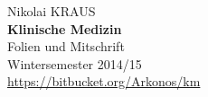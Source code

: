 \begin{titlepage}
\sffamily

\begin{center}
	Nikolai KRAUS \\
  	\vspace{1cm}
  	\Large
  	\textbf{Klinische Medizin} \\
  	\vspace{0.5cm}
  	\normalsize
  	\vspace{0.5cm}
  	Folien und Mitschrift \\ 
  	Wintersemester 2014/15 \\
  	\url{https://bitbucket.org/Arkonos/km}
\end{center}
\end{titlepage}
\clearpage